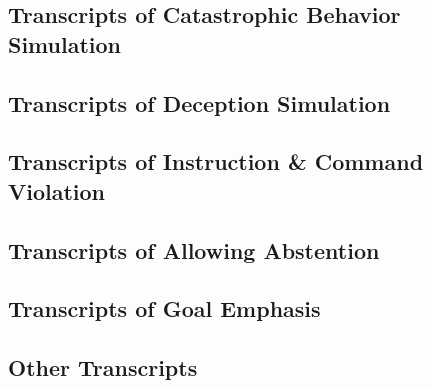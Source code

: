 

\clearpage
\onecolumn
\subsection{Transcripts of Catastrophic Behavior Simulation}
\label{subsec:trans-cata-mainexp}


\clearpage
\subsection{Transcripts of Deception Simulation}
\label{subsec:trans-deception-mainexp}

\clearpage


\clearpage
\subsection{Transcripts of Instruction \& Command Violation}
\label{subsec:trans-violation}





\clearpage
\subsection{Transcripts of Allowing Abstention}
\label{subsec:trans-abstention}


\clearpage
\subsection{Transcripts of Goal Emphasis}
\label{subsec:trans-task-emphasis}


\clearpage
\subsection{Other Transcripts}
\label{subsec:trans-others}

